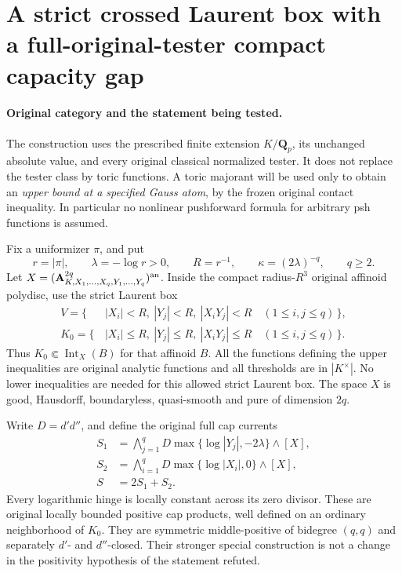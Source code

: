 \section{A strict crossed Laurent box with a full-original-tester compact capacity gap}
\label{sec:r16-crossed-box-compact-gap}

\paragraph{Original category and the statement being tested.}
The construction uses the prescribed finite extension
$K/\mathbf Q_p$, its unchanged absolute value, and every original
classical normalized tester. It does not replace the tester class by
toric functions. A toric majorant will be used only to obtain an
\emph{upper bound at a specified Gauss atom}, by the frozen original
contact inequality. In particular no nonlinear pushforward formula
for arbitrary psh functions is assumed.

Fix a uniformizer $\pi$, and put
\[
       r=|\pi|,\qquad \lambda=-\log r>0,\qquad
       R=r^{-1},\qquad \kappa=(2\lambda)^{-q},
       \qquad q\ge2.
 \tag{CB1}
\]
Let
$X=(\mathbf A^{2q}_{K,X_1,\ldots,X_q,Y_1,\ldots,Y_q})^{\rm an}$.
Inside the compact radius-$R^3$ original affinoid polydisc, use
the strict Laurent box
\[
 \begin{split}
 V=\{\, &|X_i|<R,\ |Y_j|<R,\ |X_iY_j|<R
                         \quad(1\le i,j\le q)\,\},\\
 K_0=\{\, &|X_i|\le R,\ |Y_j|\le R,\ |X_iY_j|\le R
                         \quad(1\le i,j\le q)\,\}.
 \end{split}
 \tag{CB2}
\]
Thus $K_0\Subset\operatorname{Int}_X(B)$ for that affinoid $B$.
All the functions defining the upper inequalities are original
analytic functions and all thresholds are in $|K^\times|$. No
lower inequalities are needed for this allowed strict Laurent box.
The space $X$ is good, Hausdorff, boundaryless, quasi-smooth and
pure of dimension $2q$.

Write $D=d'd''$, and define the original full cap currents
\[
 \begin{split}
 S_1&=\bigwedge_{j=1}^q
                   D\max\{\log|Y_j|,-2\lambda\}\wedge[X],\\
 S_2&=\bigwedge_{i=1}^q
                   D\max\{\log|X_i|,0\}\wedge[X],\\
 S&=2S_1+S_2.
 \end{split}
 \tag{CB3}
\]
Every logarithmic hinge is locally constant across its zero
divisor. These are original locally bounded positive cap products,
well defined on an ordinary neighborhood of $K_0$. They are
symmetric middle-positive of bidegree $(q,q)$ and separately
$d'$- and $d''$-closed. Their stronger special construction is not
a change in the positivity hypothesis of the statement refuted.

